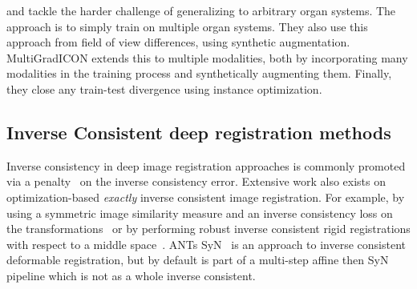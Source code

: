 \documentclass{article}
\begin{document}
\cite{uniGradICON} and \cite{multiGradICON} tackle the harder challenge of generalizing to arbitrary organ systems. The approach is to simply train on multiple organ systems. They also use this approach from field of view differences, using synthetic augmentation. MultiGradICON extends this to multiple modalities, both by incorporating many modalities in the training process and synthetically augmenting them. Finally, they close any train-test divergence using instance optimization.

\subsection{Inverse Consistent deep registration methods}

Inverse consistency in deep image registration approaches is commonly promoted 
via a penalty~\cite{greer2021icon,shen2019networks,jun2018ICNet,Nazib2021Cnn}
on the inverse consistency error. Extensive work also exists on
optimization-based \emph{exactly} inverse consistent image registration. For example, by using a symmetric image similarity measure and an inverse consistency loss on the transformations~\cite{christensen2001consistent} or by performing robust inverse consistent rigid registrations with respect to a middle space~\cite{REUTER20101181}.
ANTs SyN~\cite{avants2008symmetric} is an
approach to inverse consistent deformable registration, but by default is part
of a multi-step affine then SyN pipeline which is not as a whole inverse
consistent. %

\end{document}
